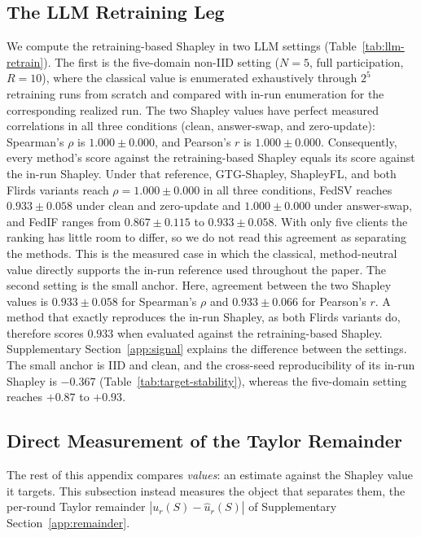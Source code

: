 \documentclass[letterpaper]{article} %
\theoremstyle{plain}
\begin{document}
\subsection{The LLM Retraining Leg}
\label{app:llm-fidelity}

We compute the retraining-based Shapley in two LLM settings
(Table~\ref{tab:llm-retrain}). The first is the
five-domain non-IID setting ($N{=}5$, full participation, $R{=}10$), where the
classical value is enumerated exhaustively through $2^5$ retraining runs from
scratch and compared with in-run enumeration for the corresponding realized
run. The two Shapley values have perfect measured correlations in all three
conditions (clean, answer-swap, and zero-update): Spearman's $\rho$ is
$1.000\pm0.000$, and Pearson's $r$ is $1.000\pm0.000$. Consequently, every
method's score against the retraining-based Shapley equals its score against
the in-run Shapley. Under that reference, GTG-Shapley, ShapleyFL, and both
Flirds variants reach $\rho = 1.000\pm0.000$ in all three conditions, FedSV
reaches $0.933\pm0.058$ under clean and zero-update and $1.000\pm0.000$ under
answer-swap, and FedIF ranges from $0.867\pm0.115$ to $0.933\pm0.058$. With
only five clients the ranking has little room to differ, so we do not read
this agreement as separating the methods. This is the measured case in which
the classical, method-neutral value directly supports the in-run reference
used throughout the paper. The second setting is the small anchor. Here, agreement
between the two Shapley values is $0.933\pm0.058$ for Spearman's $\rho$ and
$0.933\pm0.066$ for Pearson's $r$. A method that exactly reproduces the
in-run Shapley, as both Flirds variants do, therefore scores $0.933$ when
evaluated against the retraining-based Shapley. Supplementary
Section~\ref{app:signal} explains the difference between the settings. The
small anchor is IID and clean, and the cross-seed reproducibility of its
in-run Shapley is $-0.367$ (Table~\ref{tab:target-stability}), whereas the
five-domain setting reaches $+0.87$ to $+0.93$.

\subsection{Direct Measurement of the Taylor Remainder}
\label{app:remainder-measured}

The rest of this appendix compares \emph{values}: an estimate against the
Shapley value it targets. This subsection instead measures the object that
separates them, the per-round Taylor remainder
$|u_r(S) - \hat u_r(S)|$ of Supplementary Section~\ref{app:remainder}.
\end{document}
